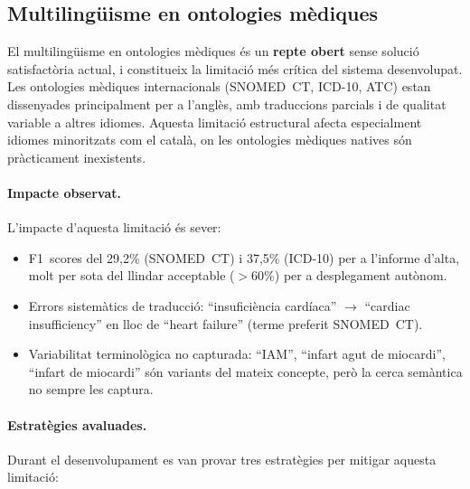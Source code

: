 \documentclass[CAT]{TFUOC}%
\begin{document}
\subsection{Multilingüisme en ontologies mèdiques}

El multilingüisme en ontologies mèdiques és un \textbf{repte obert} sense solució satisfactòria actual, i constitueix la limitació més crítica del sistema desenvolupat. Les ontologies mèdiques internacionals (SNOMED~CT, ICD-10, ATC) estan dissenyades principalment per a l'anglès, amb traduccions parcials i de qualitat variable a altres idiomes. Aquesta limitació estructural afecta especialment idiomes minoritzats com el català, on les ontologies mèdiques natives són pràcticament inexistents.

\paragraph{Impacte observat.}
L'impacte d'aquesta limitació és sever:

\begin{itemize}
    \item F1~scores del 29,2\% (SNOMED~CT) i 37,5\% (ICD-10) per a l'informe d'alta, molt per sota del llindar acceptable ($>$60\%) per a desplegament autònom.
    \item Errors sistemàtics de traducció: ``insuficiència cardíaca'' $\rightarrow$ ``cardiac insufficiency'' en lloc de ``heart failure'' (terme preferit SNOMED~CT).
    \item Variabilitat terminològica no capturada: ``IAM'', ``infart agut de miocardi'', ``infart de miocardi'' són variants del mateix concepte, però la cerca semàntica no sempre les captura.
\end{itemize}

\paragraph{Estratègies avaluades.}
Durant el desenvolupament es van provar tres estratègies per mitigar aquesta limitació:
\end{document}
